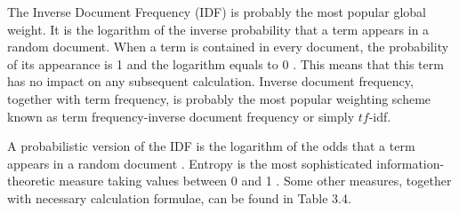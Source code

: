 \documentclass[11pt,openany,executivepaper]{book}
\begin{document}
The Inverse Document Frequency (IDF) \cite{227} is probably the most popular global weight. It is the logarithm of the inverse probability that a term appears in a random document. When a term is contained in every document, the probability of its appearance is 1 and the logarithm equals to 0 . This means that this term has no impact on any subsequent calculation. Inverse document frequency, together with term frequency, is probably the most popular weighting scheme known as term frequency-inverse document frequency or simply $t f$-idf.

A probabilistic version of the IDF is the logarithm of the odds that a term appears in a random document \cite{49}. Entropy is the most sophisticated \cite{181} information-theoretic measure \cite{77} taking values between 0 and 1 . Some other measures, together with necessary calculation formulae, can be found in Table 3.4.
\end{document}

